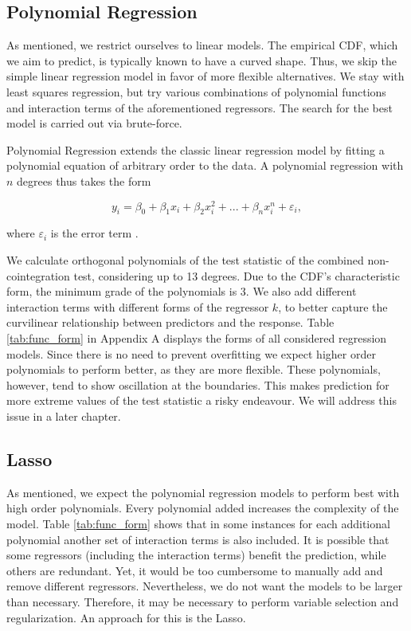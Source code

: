 \documentclass[12pt,a4paper]{article}
\begin{document}
\hypertarget{polynomial-regression}{%
\subsection{Polynomial Regression}\label{polynomial-regression}}

As mentioned, we restrict ourselves to linear models. The empirical
\ac{CDF}, which we aim to predict, is typically known to have a curved
shape. Thus, we skip the simple linear regression model in favor of more
flexible alternatives. We stay with least squares regression, but try
various combinations of polynomial functions and interaction terms of
the aforementioned regressors. The search for the best model is carried
out via brute-force.

Polynomial Regression extends the classic linear regression model by
fitting a polynomial equation of arbitrary order to the data. A
polynomial regression with \(n\) degrees thus takes the form

\begin{equation}
    y_i = \beta_0 + \beta_1 x_i + \beta_2 x_i^2 + ... + \beta_n x_i^n + \varepsilon_i,
\label{eq:7}
\end{equation}

where \(\varepsilon_i\) is the error term \autocite{James_2013}.

We calculate orthogonal polynomials of the test statistic of the
combined non-cointegration test, considering up to 13 degrees. Due to
the \ac{CDF}'s characteristic form, the minimum grade of the polynomials
is 3. We also add different interaction terms with different forms of
the regressor \(k\), to better capture the curvilinear relationship
between predictors and the response. Table \ref{tab:func_form} in
Appendix A displays the forms of all considered regression models. Since
there is no need to prevent overfitting we expect higher order
polynomials to perform better, as they are more flexible. These
polynomials, however, tend to show oscillation at the boundaries. This
makes prediction for more extreme values of the test statistic a risky
endeavour. We will address this issue in a later chapter.

\hypertarget{section}{%
\subsection{\texorpdfstring{\ac{Lasso}}{}}\label{section}}

As mentioned, we expect the polynomial regression models to perform best
with high order polynomials. Every polynomial added increases the
complexity of the model. Table \ref{tab:func_form} shows that in some
instances for each additional polynomial another set of interaction
terms is also included. It is possible that some regressors (including
the interaction terms) benefit the prediction, while others are
redundant. Yet, it would be too cumbersome to manually add and remove
different regressors. Nevertheless, we do not want the models to be
larger than necessary. Therefore, it may be necessary to perform
variable selection and regularization. An approach for this is the
\ac{Lasso}.
\end{document}
